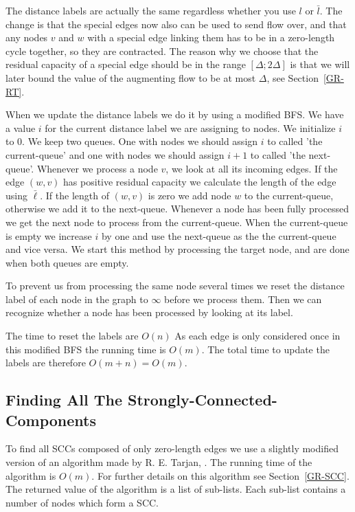 The distance labels are actually the same regardless whether you use $l$ or $\bar{l}$. 
The change is that the special edges now also can be used to send flow over, and that any nodes $v$ and $w$ with a special edge linking them has to be in a zero-length cycle together, so they are contracted.
The reason why we choose that the residual capacity of a special edge should be in the range $[\Delta;2\Delta]$ is that we will later bound
the value of the augmenting flow to be at most $\Delta$, see Section~\ref{GR-RT}.

When we update the distance labels we do it by using a modified BFS.
We have a value $i$ for the current distance label we are assigning to nodes. We initialize $i$ to 0.
We keep two queues. One with nodes we should assign $i$ to called 'the current-queue' and one with nodes we should assign $i+1$ to called 'the next-queue'. 
Whenever we process a node $v$, we look at all its incoming edges. If the edge $(w,v)$ has positive residual capacity we calculate the length of the edge
using $\bar{\ell}$. If the length of $(w,v)$ is zero we add node $w$ to the current-queue, otherwise we add it to the next-queue. Whenever a node has been
fully processed we get the next node to process from the current-queue. When the current-queue is empty we increase $i$ by one and
use the next-queue as the the current-queue and vice versa.  We start this method by processing the target node, and are done when both queues are empty.

To prevent us from processing the same node several times we reset the distance label of each node in the graph to $\infty$ before we process them. 
Then we can recognize whether a node has been processed by looking at its label.

The time to reset the labels are $O(n)$
As each edge is only considered once in this modified BFS the running time is $O(m)$. The total time to update the labels are therefore $O(m+n) = O(m)$.

\subsection{Finding All The Strongly-Connected-Components}
To find all SCCs composed of only zero-length edges we use a slightly modified version of an algorithm made by R. E. Tarjan, \cite{Tarjan1972}.
The running time of the algorithm is $O(m)$. For further details on this algorithm see Section~\ref{GR-SCC}. 
The returned value of the algorithm is a list of sub-lists. Each sub-list contains a number of nodes which form a SCC.

